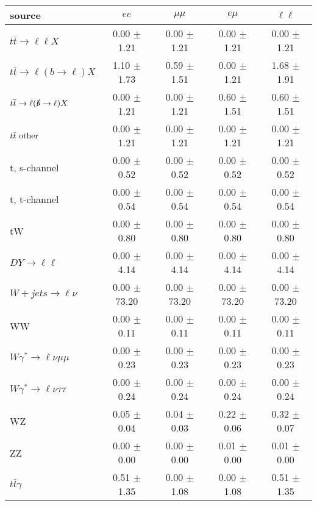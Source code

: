 \begin{tabular}{l|cccc} \hline\hline
source & $ee$ & $\mu\mu$ & $e\mu$ & $\ell\ell $ \\
\hline
$t\overline{t} \rightarrow \ell \ell X$ &  0.00 $\pm$  1.21 &  0.00 $\pm$  1.21 &  0.00 $\pm$  1.21 &  0.00 $\pm$  1.21 \\
$t\overline{t} \rightarrow \ell (b \rightarrow \ell) X$ &  1.10 $\pm$  1.73 &  0.59 $\pm$  1.51 &  0.00 $\pm$  1.21 &  1.68 $\pm$  1.91 \\
$t\overline{t} \rightarrow \ell (\slashed b \rightarrow \ell) X$ &  0.00 $\pm$  1.21 &  0.00 $\pm$  1.21 &  0.60 $\pm$  1.51 &  0.60 $\pm$  1.51 \\
        $t\overline{t}\ \rm{other}$ &  0.00 $\pm$  1.21 &  0.00 $\pm$  1.21 &  0.00 $\pm$  1.21 &  0.00 $\pm$  1.21 \\
\hline
                       t, s-channel &  0.00 $\pm$  0.52 &  0.00 $\pm$  0.52 &  0.00 $\pm$  0.52 &  0.00 $\pm$  0.52 \\
                       t, t-channel &  0.00 $\pm$  0.54 &  0.00 $\pm$  0.54 &  0.00 $\pm$  0.54 &  0.00 $\pm$  0.54 \\
                                 tW &  0.00 $\pm$  0.80 &  0.00 $\pm$  0.80 &  0.00 $\pm$  0.80 &  0.00 $\pm$  0.80 \\
\hline
         $DY \rightarrow \ell \ell$ &  0.00 $\pm$  4.14 &  0.00 $\pm$  4.14 &  0.00 $\pm$  4.14 &  0.00 $\pm$  4.14 \\
      $W+jets \rightarrow \ell \nu$ &  0.00 $\pm$ 73.20 &  0.00 $\pm$ 73.20 &  0.00 $\pm$ 73.20 &  0.00 $\pm$ 73.20 \\
                                 WW &  0.00 $\pm$  0.11 &  0.00 $\pm$  0.11 &  0.00 $\pm$  0.11 &  0.00 $\pm$  0.11 \\
\hline
$W\gamma^{*} \rightarrow \ell \nu \mu\mu$ &  0.00 $\pm$  0.23 &  0.00 $\pm$  0.23 &  0.00 $\pm$  0.23 &  0.00 $\pm$  0.23 \\
$W\gamma^{*} \rightarrow \ell \nu \tau\tau$ &  0.00 $\pm$  0.24 &  0.00 $\pm$  0.24 &  0.00 $\pm$  0.24 &  0.00 $\pm$  0.24 \\
                                 WZ &  0.05 $\pm$  0.04 &  0.04 $\pm$  0.03 &  0.22 $\pm$  0.06 &  0.32 $\pm$  0.07 \\
                                 ZZ &  0.00 $\pm$  0.00 &  0.00 $\pm$  0.00 &  0.01 $\pm$  0.00 &  0.01 $\pm$  0.00 \\
\hline
              $t\overline{t}\gamma$ &  0.51 $\pm$  1.35 &  0.00 $\pm$  1.08 &  0.00 $\pm$  1.08 &  0.51 $\pm$  1.35 \\

\end{tabular}
